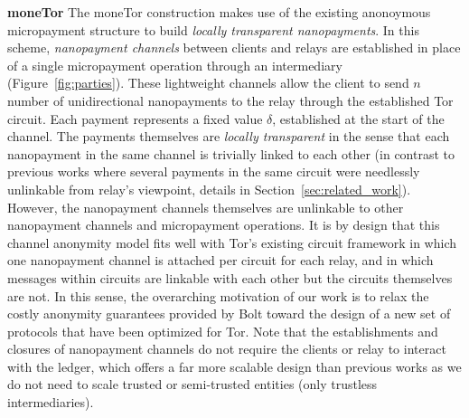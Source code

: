 
\textbf{moneTor} The moneTor construction makes use of the existing anonoymous
micropayment structure to build \emph{locally transparent nanopayments}. In this
scheme, \emph{nanopayment channels} between clients and relays are established
in place of a single micropayment operation through an intermediary
(Figure~\ref{fig:parties}). These lightweight channels allow the client to send
$n$ number of unidirectional nanopayments to the relay through the established
Tor circuit. Each payment represents a fixed value $\delta$, established at the
start of the channel. The payments themselves are \emph{locally transparent} in
the sense that each nanopayment in the same channel is trivially linked to each
other (in contrast to previous works where several payments in the same circuit
were needlessly unlinkable from relay's viewpoint, details in
Section~\ref{sec:related_work}). However, the nanopayment channels themselves
are unlinkable to other nanopayment channels and micropayment operations. It is
by design that this channel anonymity model fits well with Tor's existing
circuit framework in which one nanopayment channel is attached per circuit for
each relay, and in which messages within circuits are linkable with each other
but the circuits themselves are not. In this sense, the overarching motivation
of our work is to relax the costly anonymity guarantees provided by Bolt toward
the design of a new set of protocols that have been optimized for Tor. Note that
the establishments and closures of nanopayment channels do not require the
clients or relay to interact with the ledger, which offers a far more scalable
design than previous works as we do not need to scale trusted or semi-trusted
entities (only trustless intermediaries).

